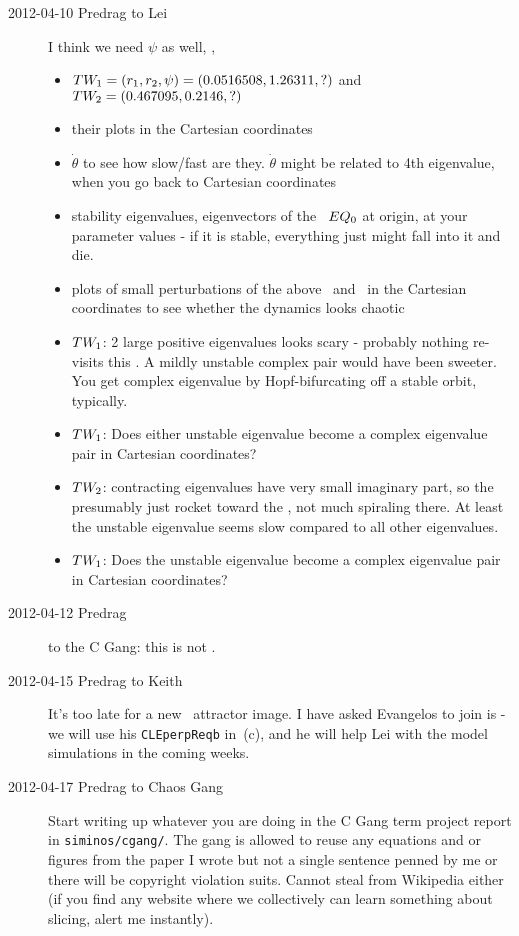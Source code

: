\begin{description}
\item[2012-04-10 Predrag to Lei] I think we need $\psi$ as well, \ie,
\begin{itemize}
  \item $TW_{1} = (r_1,r_2,\psi)=(0.0516508, 1.26311,?)$ and
        $TW_{2} = (0.467095,0.2146,?)$
  \item their plots in the Cartesian coordinates
  \item $\dot{\theta}$ to see how slow/fast are they. $\dot{\theta}$
        might be related to 4th eigenvalue, when you go back
        to Cartesian coordinates
  \item stability eigenvalues, eigenvectors of the \eqv\ $EQ_{0}$ at
        origin, at your parameter values - if it is stable, everything
        just might fall into it and die.
  \item plots of small perturbations of the above \eqv\ and \reqva\ in
        the Cartesian coordinates to see whether the dynamics looks
        chaotic
  \item $TW_{1}$: 2 large positive eigenvalues looks scary - probably
        nothing re-visits this \reqv. A mildly unstable complex pair
        would have been sweeter. You get complex eigenvalue by Hopf-bifurcating off a
        stable orbit, typically.
  \item $TW_{1}$: Does either unstable eigenvalue become a complex
        eigenvalue pair in Cartesian coordinates?
  \item $TW_{2}$: contracting eigenvalues have very small imaginary
        part, so the presumably just rocket toward the \reqv, not much
        spiraling there. At least the unstable eigenvalue seems slow
        compared to all other eigenvalues.
  \item $TW_{1}$: Does the unstable eigenvalue become a complex
        eigenvalue pair in Cartesian coordinates?
\end{itemize}

\item[2012-04-12 Predrag] to the C Gang: this is not
.

\item[2012-04-15 Predrag to Keith] It's too late for a new \cLe\
attractor image. I have asked Evangelos to join is - we will use his
\texttt{CLEperpReqb} in \reffig{fig:CLf01group}\,(c), and he will help
Lei with the {\twoMode} model simulations in the coming weeks.

\item[2012-04-17 Predrag to Chaos Gang]
Start writing up whatever you are doing in the C Gang term project report
in \texttt{siminos/cgang/}. The gang is allowed to reuse any equations
and or figures from the paper I wrote\rf{atlas12} but not a single
sentence penned by me or there will be copyright violation suits. Cannot
steal from Wikipedia either (if you find any website where we
collectively can learn something about slicing, alert me instantly).


\end{description}
